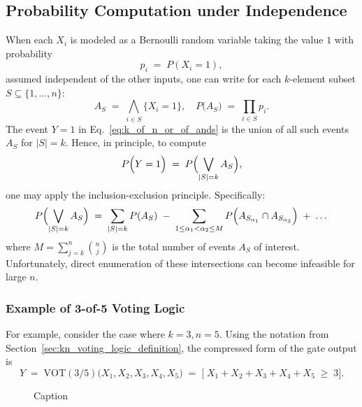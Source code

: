 \subsection{Probability Computation under Independence}
When each \(X_i\) is modeled as a Bernoulli random variable taking the value \(1\) with probability
\[
p_i \;=\; P(X_i = 1),
\]
assumed independent of the other inputs, one can write for each \(k\)-element subset \(S \subseteq \{1,\ldots,n\}\):
\[
A_S \;=\;\bigwedge_{i \in S} \{X_i = 1\},
\quad
P\bigl(A_S\bigr) 
\;=\;
\prod_{i \in S} p_i.
\]
The event \(Y=1\) in Eq.~\eqref{eq:k_of_n_or_of_ands} is the union of all such events \(A_S\) for \(\lvert S\rvert = k\). Hence, in principle, to compute
\[
P\Bigl(Y = 1\Bigr)
\;=\;
P\Bigl(\bigvee_{\lvert S\rvert = k} A_S\Bigr),
\]
one may apply the inclusion-exclusion principle. Specifically:
\begin{equation}
\label{eq:union_inclusion_exclusion}
P\Bigl(\bigvee_{\lvert S\rvert = k} A_S\Bigr)
\;=\;
\sum_{\lvert S\rvert=k}P(A_S)
\;-\;\sum_{1\le \alpha_1<\alpha_2\le M}P\Bigl(A_{S_{\alpha_1}}\cap A_{S_{\alpha_2}}\Bigr)
\;+\;\dots
\end{equation}
where \(M=\sum_{j=k}^{n} \binom{n}{j}\) is the total number of events \(A_S\) of interest. Unfortunately, direct enumeration of these intersections can become infeasible for large \(n\).

\subsubsection{Example of 3-of-5 Voting Logic}
\label{sec:3_of_5_voting_logic_example}

For example, consider the case where $k=3, n=5$. Using the notation from Section~\ref{sec:kn_voting_logic_definition}, the compressed form of the gate output is
\[
Y \;=\; \mathrm{VOT}(3/5)\bigl(X_1, X_2, X_3, X_4, X_5\bigr)
\;=\;
\bigl[\;X_1 + X_2 + X_3 + X_4 + X_5 \;\ge\; 3\bigr].
\]

\begin{figure}[h!]
    \centering
    \resizebox{\textwidth}{!}{%
    
    }
    \caption{Caption}
    \label{fig:example-3of5-voter-tree}
\end{figure}

